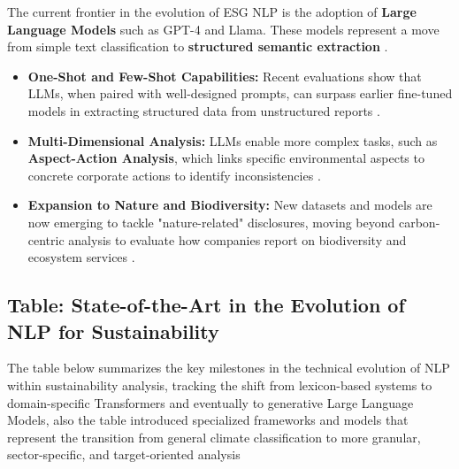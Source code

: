 The current frontier in the evolution of ESG NLP is the adoption of \textbf{Large Language Models} such as GPT-4 and Llama. These models represent a move from simple text classification to \textbf{structured semantic extraction}  \parencite{seyed_alireza_mousavian_anaraki_b56a1c0f}.
\begin{itemize}
\item 

\textbf{One-Shot and Few-Shot Capabilities:} Recent evaluations show that LLMs, when paired with well-designed prompts, can surpass earlier fine-tuned models in extracting structured data from unstructured reports  \parencite{frederik_maibaum_b8629037}.\item 

\textbf{Multi-Dimensional Analysis:} LLMs enable more complex tasks, such as \textbf{Aspect-Action Analysis}, which links specific environmental aspects to concrete corporate actions to identify inconsistencies  \parencite{keane_ong_369a0b63}.\item 

\textbf{Expansion to Nature and Biodiversity:} New datasets and models are now emerging to tackle "nature-related" disclosures, moving beyond carbon-centric analysis to evaluate how companies report on biodiversity and ecosystem services  \parencite{tobias_schimanski_3549ff9f}.
\end{itemize}
\subsection{Table: State-of-the-Art in the Evolution of NLP for Sustainability}

The table below summarizes the key milestones in the technical evolution of NLP within sustainability analysis, tracking the shift from lexicon-based systems to domain-specific Transformers and eventually to generative Large Language Models, also the table introduced specialized frameworks and models that represent the transition from general climate classification to more granular, sector-specific, and target-oriented analysis

